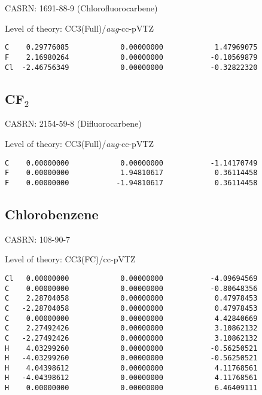 \documentclass[journal=jctcce,manuscript=article,layout=traditional]{achemso}
\newcommand{\TZ}{cc-pVTZ}
\newcommand{\AVTZ}{\emph{aug}-cc-pVTZ}
\begin{document}
CASRN: 1691-88-9 (Chlorofluorocarbene)

\begin{singlespace}
\noindent Level of theory: CC3(Full)/{\AVTZ}
\begin{verbatim}
C    0.29776085            0.00000000            1.47969075
F    2.16980264            0.00000000           -0.10569879
Cl  -2.46756349            0.00000000           -0.32822320
\end{verbatim}
\end{singlespace}

\subsection{CF$_2$}

CASRN: 2154-59-8 (Difluorocarbene)

\begin{singlespace}
\noindent Level of theory: CC3(Full)/{\AVTZ}
\begin{verbatim}
C    0.00000000            0.00000000           -1.14170749
F    0.00000000            1.94810617            0.36114458
F    0.00000000           -1.94810617            0.36114458
\end{verbatim}
\end{singlespace}

\subsection{Chlorobenzene}

CASRN: 108-90-7

\begin{singlespace}
\noindent Level of theory: CC3(FC)/{\TZ}
\begin{verbatim}
Cl   0.00000000            0.00000000           -4.09694569
C    0.00000000            0.00000000           -0.80648356
C    2.28704058            0.00000000            0.47978453
C   -2.28704058            0.00000000            0.47978453
C    0.00000000            0.00000000            4.42840669
C    2.27492426            0.00000000            3.10862132
C   -2.27492426            0.00000000            3.10862132
H    4.03299260            0.00000000           -0.56250521
H   -4.03299260            0.00000000           -0.56250521
H    4.04398612            0.00000000            4.11768561
H   -4.04398612            0.00000000            4.11768561
H    0.00000000            0.00000000            6.46409111
\end{verbatim}
\end{singlespace}
\end{document}
